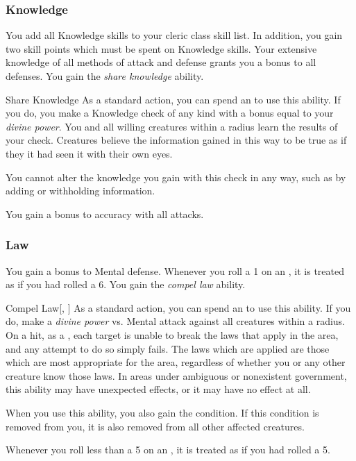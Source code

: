         \subsubsection{Knowledge}
             You add all Knowledge skills to your cleric class skill list.
            In addition, you gain two skill points which must be spent on Knowledge skills.
             Your extensive knowledge of all methods of attack and defense grants you a  bonus to all defenses.
             You gain the \textit{share knowledge} ability.
            \begin{ability}{Share Knowledge}
                As a standard action, you can spend an  to use this ability.
                If you do, you make a Knowledge check of any kind with a bonus equal to your \textit{divine power}.
                You and all willing creatures within a \arealarge radius learn the results of your check.
                Creatures believe the information gained in this way to be true as if they it had seen it with their own eyes.

                You cannot alter the knowledge you gain with this check in any way, such as by adding or withholding information.
            \end{ability}
             You gain a  bonus to accuracy with all attacks.

        \subsubsection{Law}
             You gain a  bonus to Mental defense.
             Whenever you roll a 1 on an , it is treated as if you had rolled a 6.
             You gain the \textit{compel law} ability.
            \begin{ability}{Compel Law}[, ]
                As a standard action, you can spend an  to use this ability.
                If you do, make a \textit{divine power} vs. Mental attack against all creatures within a \arealarge radius.
                On a hit, as a , each target is unable to break the laws that apply in the area, and any attempt to do so simply fails.
                The laws which are applied are those which are most appropriate for the area, regardless of whether you or any other creature know those laws.
                In areas under ambiguous or nonexistent government, this ability may have unexpected effects, or it may have no effect at all.

                When you use this ability, you also gain the condition.
                If this condition is removed from you, it is also removed from all other affected creatures.
            \end{ability}
             Whenever you roll less than a 5 on an , it is treated as if you had rolled a 5.

